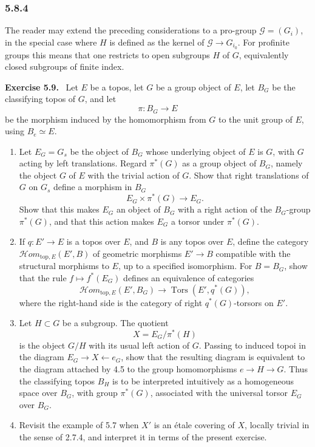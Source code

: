 \documentclass[11pt]{article}
\newcommand{\Ttors}{\operatorname{Tors}}
\newenvironment{remarktext}[1]{\par\medskip\noindent\textbf{#1.}\ }{\par\medskip}
\begin{document}
\subsubsection*{5.8.4}
The reader may extend the preceding considerations to a pro-group \(\mathcal G=(G_i)\), in the special case where \(H\) is defined as the kernel of \(\mathcal G\to G_{i_0}\). For profinite groups this means that one restricts to open subgroups \(H\) of \(G\), equivalently closed subgroups of finite index.

\begin{remarktext}{Exercise 5.9}
Let \(E\) be a topos, let \(G\) be a group object of \(E\), let \(B_G\) be the classifying topos of \(G\), and let
\[
\pi:B_G\longrightarrow E
\]
be the morphism induced by the homomorphism from \(G\) to the unit group of \(E\), using \(B_e\simeq E\).
\begin{enumerate}[label=\alph*)]
\item Let \(E_G=G_s\) be the object of \(B_G\) whose underlying object of \(E\) is \(G\), with \(G\) acting by left translations. Regard \(\pi^*(G)\) as a group object of \(B_G\), namely the object \(G\) of \(E\) with the trivial action of \(G\). Show that right translations of \(G\) on \(G_s\) define a morphism in \(B_G\)
\[
E_G\times\pi^*(G)\longrightarrow E_G.
\]
Show that this makes \(E_G\) an object of \(B_G\) with a right action of the \(B_G\)-group \(\pi^*(G)\), and that this action makes \(E_G\) a torsor under \(\pi^*(G)\).

\item If \(q:E'\to E\) is a topos over \(E\), and \(B\) is any topos over \(E\), define the category \(\mathcal{H}om_{\mathrm{top},E}(E',B)\) of geometric morphisms \(E'\to B\) compatible with the structural morphisms to \(E\), up to a specified isomorphism. For \(B=B_G\), show that the rule \(f\mapsto f^*(E_G)\) defines an equivalence of categories
\[
\mathcal{H}om_{\mathrm{top},E}(E',B_G)\longrightarrow \Ttors(E',q^*(G)),
\]
where the right-hand side is the category of right \(q^*(G)\)-torsors on \(E'\).

\item Let \(H\subset G\) be a subgroup. The quotient
\[
X=E_G/\pi^*(H)
\]
is the object \(G/H\) with its usual left action of \(G\). Passing to induced topoi in the diagram \(E_G\to X\leftarrow e_G\), show that the resulting diagram is equivalent to the diagram attached by 4.5 to the group homomorphisms \(e\to H\to G\). Thus the classifying topos \(B_H\) is to be interpreted intuitively as a homogeneous space over \(B_G\), with group \(\pi^*(G)\), associated with the universal torsor \(E_G\) over \(B_G\).

\item Revisit the example of 5.7 when \(X'\) is an \'etale covering of \(X\), locally trivial in the sense of 2.7.4, and interpret it in terms of the present exercise.
\end{enumerate}
\end{remarktext}
\end{document}
